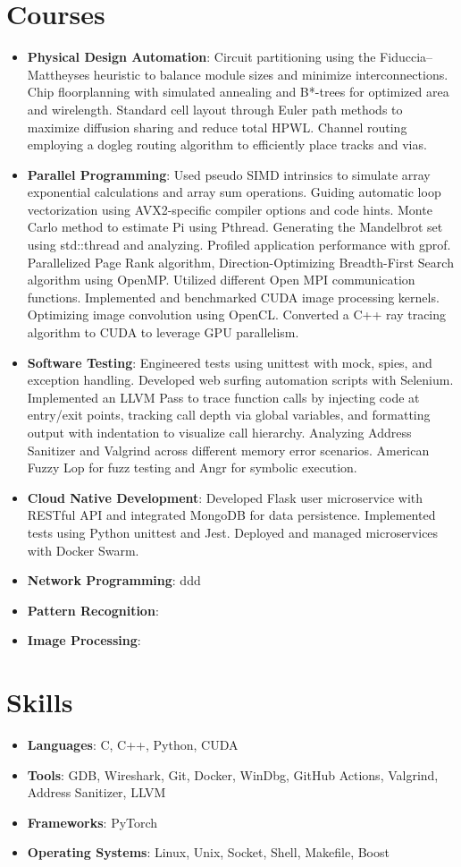 \documentclass[letterpaper,11pt]{article}
\newcommand{\resumeItem}[2]{
  \item\small{
    \textbf{#1}{: #2 \vspace{-2pt}}
  }
}
\newcommand{\resumeSubItem}[2]{\resumeItem{#1}{#2}\vspace{-4pt}}
\newcommand{\resumeSubHeadingListStart}{\begin{itemize}[leftmargin=*]}
\newcommand{\resumeSubHeadingListEnd}{\end{itemize}}
\begin{document}
\section{Courses}
  \resumeSubHeadingListStart
    \resumeSubItem{Physical Design Automation}
      {Circuit partitioning using the Fiduccia–Mattheyses heuristic to balance module sizes and minimize interconnections. 
        Chip floorplanning with simulated annealing and B*-trees for optimized area and wirelength.
        Standard cell layout through Euler path methods to maximize diffusion sharing and reduce total HPWL.
        Channel routing employing a dogleg routing algorithm to efficiently place tracks and vias.}
    \resumeSubItem{Parallel Programming}
      {Used pseudo SIMD intrinsics to simulate array exponential calculations and array sum operations.
      Guiding automatic loop vectorization using AVX2-specific compiler options and code hints. 
      Monte Carlo method to estimate Pi using Pthread. 
      Generating the Mandelbrot set using std::thread and analyzing.
      Profiled application performance with gprof.
      Parallelized Page Rank algorithm, Direction-Optimizing Breadth-First Search algorithm using OpenMP.
      Utilized different Open MPI communication functions.
      Implemented and benchmarked CUDA image processing kernels.
      Optimizing image convolution using OpenCL.
      Converted a C++ ray tracing algorithm to CUDA to leverage GPU parallelism.
      }
    \resumeSubItem{Software Testing}
      {Engineered tests using unittest with mock, spies, and exception handling.
      Developed web surfing automation scripts with Selenium.
      Implemented an LLVM Pass to trace function calls by injecting code at entry/exit points, tracking call depth via global variables, and formatting output with indentation to visualize call hierarchy.
      Analyzing Address Sanitizer and Valgrind across different memory error scenarios.
      American Fuzzy Lop for fuzz testing and Angr for symbolic execution.}
    \resumeSubItem{Cloud Native Development}
      {Developed Flask user microservice with RESTful API and integrated MongoDB for data persistence.
      Implemented tests using Python unittest and Jest. Deployed and managed microservices with Docker Swarm.}
    \resumeSubItem{Network Programming}
      {ddd}
    \resumeSubItem{Pattern Recognition}
      {}
    \resumeSubItem{Image Processing}
      {}
  \resumeSubHeadingListEnd

\section{Skills}
  \resumeSubHeadingListStart
  \resumeSubItem{Languages}
    {C, C++, Python, CUDA}
  \resumeSubItem{Tools}
    {GDB, Wireshark, Git, Docker, WinDbg, GitHub Actions, Valgrind, Address Sanitizer, LLVM}
  \resumeSubItem{Frameworks}
    {PyTorch}
  \resumeSubItem{Operating Systems}
    {Linux, Unix, Socket, Shell, Makefile, Boost}
  \resumeSubHeadingListEnd

\end{document}
